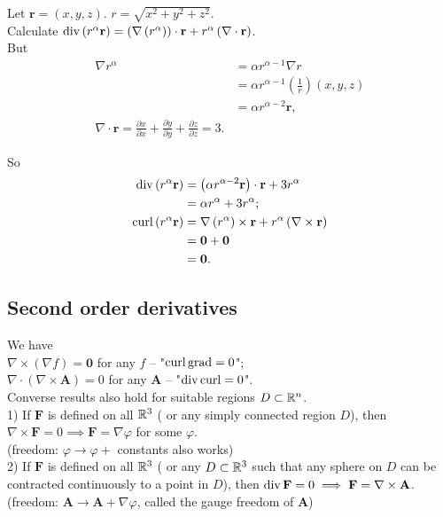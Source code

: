 \documentclass[a4paper]{article}
\begin{document}
\begin{eg}
Let $\mathbf{r}=\left(x,y,z\right)$. $r=\sqrt{x^2+y^2+z^2}$.\\
Calculate $\operatorname{div} \left(r^\alpha\mathbf{r}\right) = \left(\nabla\left(r^\alpha\right)\right)\cdot\mathbf{r}+r^\alpha\left(\nabla\cdot\mathbf{r}\right)$.\\
But
\begin{equation*}
\begin{aligned}
\nabla r^\alpha &= \alpha r^{\alpha-1} \nabla r\\
&=\alpha r^{\alpha-1}\left(\frac{1}{r}\right)\left(x,y,z\right)\\
&=\alpha r^{\alpha-2}\mathbf{r},\\
\nabla\cdot\mathbf{r} = \frac{\partial x}{\partial x} + \frac{\partial y}{\partial y} + \frac{\partial z}{\partial z} = 3.
\end{aligned}
\end{equation*}

So
\begin{equation*}
\begin{aligned}
\operatorname{div}\left(r^\alpha \mathbf{r}\right)&=\left(\alpha r^{\alpha-2}\mathbf{r}\right)\cdot\mathbf{r}+3r^\alpha\\
&=\alpha r^\alpha + 3r^\alpha;\\
\operatorname{curl}\left(r^\alpha\mathbf{r}\right)&=\nabla\left(r^\alpha\right)\times\mathbf{r}+r^\alpha\left(\nabla\times\mathbf{r}\right)\\
&=\mathbf{0}+\mathbf{0}\\
&=\mathbf{0}.
\end{aligned}
\end{equation*}
\end{eg}

\subsection{Second order derivatives}
We have\\
$\nabla\times\left(\nabla f\right)=\mathbf{0}$ for any $f$ -- "$\operatorname{curl}\operatorname{grad}=0$";\\
$\nabla\cdot\left(\nabla\times\mathbf{A}\right)=0$ for any $\mathbf{A}$ -- "$\operatorname{div}\operatorname{curl}=0$".\\
Converse results also hold for suitable regions $D \subset \mathbb{R}^n$.\\
1) If $\mathbf{F}$ is defined on all $\mathbb{R}^3$ ( or any simply connected region $D$), then $\nabla\times\mathbf{F}=0 \implies \mathbf{F}=\nabla\varphi$ for some $\varphi$.\\
(freedom: $\varphi \to \varphi +$ constants also works)\\
2) If $\mathbf{F}$ is defined on all $\mathbb{R}^3$ ( or any $D \subset \mathbb{R}^3$ such that any sphere on $D$ can be contracted continuously to a point in $D$), then $\operatorname{div} \mathbf{F}=0 \implies \mathbf{F}=\nabla\times\mathbf{A}$.\\
(freedom: $\mathbf{A}\to\mathbf{A}+\nabla\varphi$, called the gauge freedom of $\mathbf{A}$)\\
\end{document}
